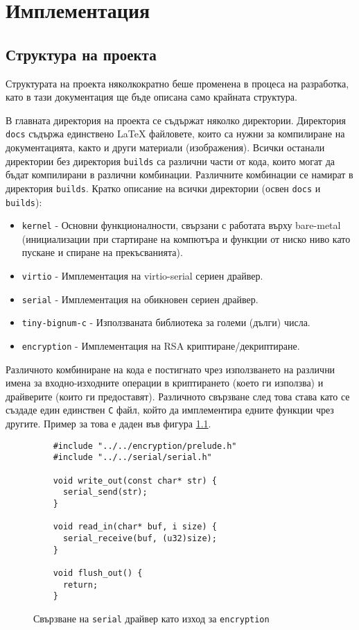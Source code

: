 \chapter{Имплементация} %
\section{Структура на проекта}
Структурата на проекта няколкократно беше променена в процеса на разработка, като в тази документация ще бъде описана само крайната структура.

В главната директория на проекта се съдържат няколко директории. Директория {\tt docs} съдържа единствено \LaTeX{} файловете, които са нужни за компилиране на документацията, както и други материали (изображения). Всички останали директории без директория {\tt builds} са различни части от кода, които могат да бъдат компилирани в различни комбинации. Различните комбинации се намират в директория {\tt builds}. Кратко описание на всички директории (освен {\tt docs} и {\tt builds}):
\begin{itemize}
  \item {\tt kernel} - Основни функционалности, свързани с работата върху bare-metal (инициализации при стартиране на компютъра и функции от ниско ниво като пускане и спиране на прекъсванията).
  \item {\tt virtio} - Имплементация на virtio-serial сериен драйвер.
  \item {\tt serial} - Имплементация на обикновен сериен драйвер.
  \item {\tt tiny-bignum-c} - Използваната библиотека за големи (дълги) числа.
  \item {\tt encryption} - Имплементация на RSA криптиране/декриптиране.
\end{itemize}

Различното комбиниране на кода е постигнато чрез използването на различни имена за входно-изходните операции в криптирането (което ги използва) и драйверите (които ги предоставят). Различното свързване след това става като се създаде един единствен {\tt C} файл, който да имплементира едните функции чрез другите. Пример за това е даден във фигура \ref{fig:io-file-example}.
\begin{figure}[htpb]
  \centering
  \caption{Свързване на {\tt serial} драйвер като изход за {\tt encryption}}
  \begin{verbatim}
    #include "../../encryption/prelude.h"
    #include "../../serial/serial.h"

    void write_out(const char* str) {
      serial_send(str);
    }

    void read_in(char* buf, i size) {
      serial_receive(buf, (u32)size);
    }

    void flush_out() {
      return;
    }
  \end{verbatim}
  \label{fig:io-file-example}
\end{figure}

